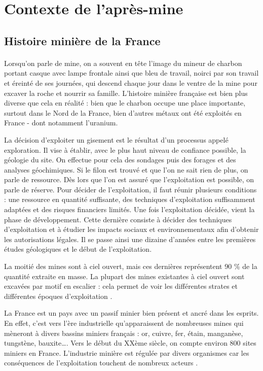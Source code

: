 \documentclass{article}
\begin{document}
\section{Contexte de l’après-mine}

\subsection{Histoire minière de la France}

\paragraph{} Lorsqu’on parle de mine, on a souvent en tête l’image du mineur de charbon portant casque avec lampe frontale ainsi que bleu de travail, noirci par son travail et éreinté de ses journées, qui descend chaque jour dans le ventre de la mine pour excaver la roche et nourrir sa famille. L’histoire minière française est bien plus diverse que cela en réalité : bien que le charbon occupe une place importante, surtout dans le Nord de la France, bien d’autres métaux ont été exploités en France - dont notamment l’uranium.

La décision d’exploiter un gisement est le résultat d’un processus appelé exploration. Il vise à établir, avec le plus haut niveau de confiance possible, la géologie du site. On effectue pour cela des sondages puis des forages et des analyses géochimiques. Si le filon est trouvé et que l’on ne sait rien de plus, on parle de ressource. Dès lors que l’on est assuré que l’exploitation est possible, on parle de réserve. Pour décider de l’exploitation, il faut réunir plusieurs conditions : une ressource en quantité suffisante, des techniques d’exploitation suffisamment adaptées et des risques financiers limités. Une fois l’exploitation décidée, vient la phase de développement. Cette dernière consiste à décider des techniques d’exploitation et à étudier les impacts sociaux et environnementaux afin d’obtenir les autorisations légales. Il se passe ainsi une dizaine d’années entre les premières études géologiques et le début de l’exploitation. 

La moitié des mines sont à ciel ouvert, mais ces dernières représentent 90 \% de la quantité extraite en masse. La plupart des mines existantes à ciel ouvert sont excavées par motif en escalier : cela permet de voir les différentes strates et différentes époques d’exploitation \cite{raimbault_mine_2020}.

La France est un pays avec un passif minier bien présent et ancré dans les esprits. En effet, c’est vers l’ère industrielle qu’apparaissent de nombreuses mines qui mèneront à divers bassins miniers français : or, cuivre, fer, étain, manganèse, tungstène, bauxite…. Vers le début du XXème siècle, on compte environ 800 sites miniers en France. L’industrie minière est régulée par divers organismes car les conséquences de l’exploitation touchent de nombreux acteurs \cite{ledoux_notions_2020}.
\end{document}
